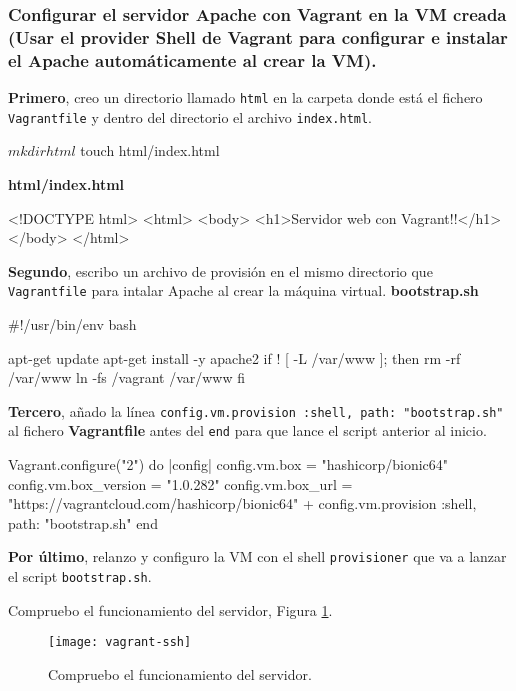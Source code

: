 \subsubsection{Configurar el servidor Apache con Vagrant en la VM creada (Usar el provider Shell de Vagrant para configurar e instalar el Apache automáticamente al crear la VM).}
\par \textbf{Primero}, creo un directorio llamado \texttt{html} en la carpeta donde está el fichero \texttt{Vagrantfile} 
y dentro del directorio el archivo \texttt{index.html}.
\begin{listing}[style=consola]
    $ mkdir html
    $ touch html/index.html
\end{listing}
\textbf{html/index.html}
\begin{listing}
    <!DOCTYPE html>
    <html>
        <body>
        <h1>Servidor web con Vagrant!!</h1>
        </body>
    </html>
 \end{listing}
 \par \textbf{Segundo}, escribo un archivo de provisión en el mismo directorio que \texttt{Vagrantfile}
 para intalar Apache al crear la máquina virtual.
 \textbf{bootstrap.sh}
 \begin{listing}
    #!/usr/bin/env bash

    apt-get update
    apt-get install -y apache2
    if ! [ -L /var/www ]; then
        rm -rf /var/www
        ln -fs /vagrant /var/www
    fi 
\end{listing}
\par \textbf{Tercero}, añado la línea \texttt{config.vm.provision :shell, path: "bootstrap.sh"}
 al fichero \textbf{Vagrantfile} antes del \texttt{end} para que lance el script anterior al inicio.
\begin{listing}
    Vagrant.configure("2") do |config|
        config.vm.box = "hashicorp/bionic64"
        config.vm.box_version = "1.0.282"
        config.vm.box_url = "https://vagrantcloud.com/hashicorp/bionic64"
  +     config.vm.provision :shell, path: "bootstrap.sh"
    end
 \end{listing}
 \par \textbf{Por último}, relanzo y configuro la VM con el shell \texttt{provisioner} que va a
 lanzar el script \texttt{bootstrap.sh}.
\par Compruebo el funcionamiento del servidor, Figura \ref{fig:vagrant-ssh}.
\begin{figure}[H]
    \texttt{[image: vagrant-ssh]}
    \centering
    \caption{Compruebo el funcionamiento del servidor.}
    \label{fig:vagrant-ssh}
 \end{figure}
